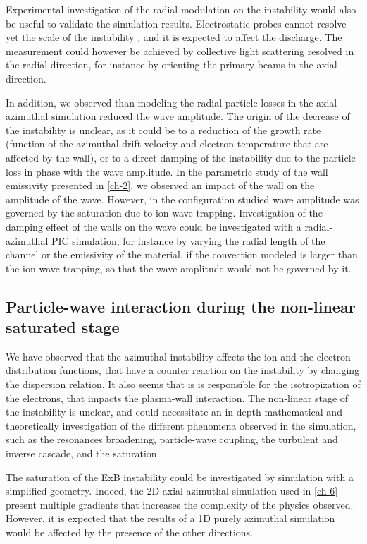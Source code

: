 Experimental investigation of the radial modulation on the instability would also be useful to validate the simulation results.
Electrostatic probes cannot resolve yet the scale of the instability \citep{brown2018}, and it is expected to affect the discharge.
The measurement could however be achieved by collective light scattering \citep{tsikata2009} resolved in the radial direction, for instance by orienting the primary beams in the axial direction.

In addition, we observed than modeling the radial particle losses in the axial-azimuthal simulation reduced the wave amplitude.
The origin of the decrease of the instability is unclear, as it could be to a reduction of the growth rate (function of the azimuthal drift velocity and electron temperature that are affected by the wall), or to a direct damping of the instability due to the particle loss in phase with the wave amplitude.
In the parametric study of the wall emissivity presented in \cref{ch-2}, we observed an impact of the wall on the amplitude of the wave.
However, in the configuration studied wave amplitude was governed by the saturation due to ion-wave trapping.
Investigation of the damping effect of the walls on the wave could be investigated with a radial-azimuthal PIC simulation, for instance by varying the radial length of the channel or the emissivity of the material, if the convection modeled is larger than the ion-wave trapping, so that the wave amplitude would not be governed by it.



\subsection{Particle-wave interaction during the non-linear saturated stage}
We have observed that the azimuthal instability affects the ion and the electron distribution functions, that have a counter reaction on the instability by changing the dispersion relation.
It also seems that is is responsible for the isotropization of the electrons, that impacts the plasma-wall interaction.
The non-linear stage of the instability is unclear, and could necessitate an in-depth mathematical and theoretically investigation of the different phenomena observed in the simulation, such as the resonances broadening, particle-wave coupling, the turbulent and inverse cascade, and the saturation.

The saturation of the ExB instability could be investigated by simulation with a simplified geometry.
Indeed, the 2D axial-azimuthal simulation used in \cref{ch-6} present multiple gradients that increases the complexity of the physics observed.
However, it is expected that the results of a 1D purely azimuthal simulation would be affected by the presence of the other directions.

